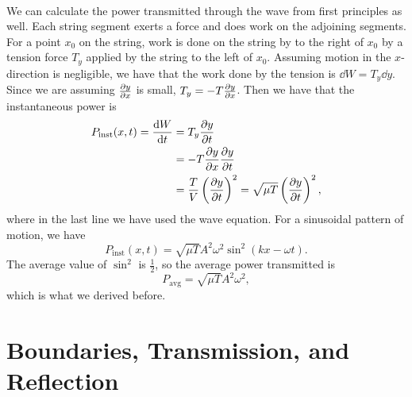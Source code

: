 \documentclass[../classical_mechanics.tex]{subfiles}
\begin{document}
        \paragraph{}
        We can calculate the power transmitted through the wave from first principles as well.
        Each string segment exerts a force and does work on the adjoining segments.
        For a point $x_0$ on the string, work is done on the string by to the right of $x_0$ by a tension force $T_y$ applied by the string to the left of $x_0$.
        Assuming motion in the $x$-direction is negligible, we have that the work done by the tension is $\dd{W}=T_y\dd{y}$.
        Since we are assuming $\pdv{y}{x}$ is small, $T_y=-T\pdv{y}{x}$.
        Then we have that the instantaneous power is
        \begin{align}
            P_\text{inst}(x,t)=\dv{W}{t}&=T_y\pdv{y}{t}\\
            &=-T\pdv{y}{x}\pdv{y}{t}\\
            &=\frac{T}{V}\left(\pdv{y}{t}\right)^2=\sqrt{\mu T}\left(\pdv{y}{t}\right)^2,
        \end{align}
        where in the last line we have used the wave equation.
        For a sinusoidal pattern of motion, we have
        \begin{equation}
            P_\text{inst}(x,t)=\sqrt{\mu T}A^2\omega^2\sin^2(kx-\omega t).
        \end{equation}
        The average value of $\sin^2$ is $\frac{1}{2}$, so the average power transmitted is
        \begin{equation}
            P_\text{avg}=\sqrt{\mu T}A^2\omega^2,
        \end{equation}
        which is what we derived before.

    \section{Boundaries, Transmission, and Reflection}
\end{document}
